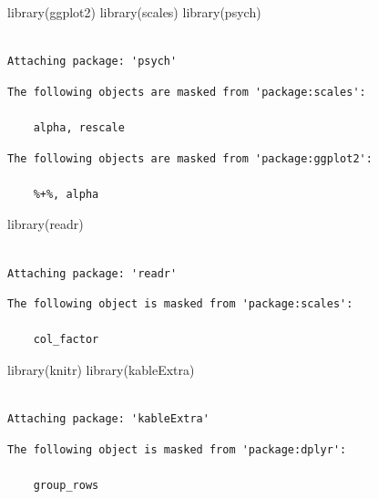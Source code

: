 \documentclass[
  letterpaper,
  DIV=11,
  numbers=noendperiod]{scrreprt}
\newenvironment{Shaded}{\begin{snugshade}}{\end{snugshade}}
\newcommand{\FunctionTok}[1]{\textcolor[rgb]{0.28,0.35,0.67}{#1}}
\newcommand{\NormalTok}[1]{\textcolor[rgb]{0.00,0.23,0.31}{#1}}
\begin{document}
\begin{Shaded}
\begin{Highlighting}[]
\FunctionTok{library}\NormalTok{(ggplot2)}
\FunctionTok{library}\NormalTok{(scales)}
\FunctionTok{library}\NormalTok{(psych)}
\end{Highlighting}
\end{Shaded}

\begin{verbatim}

Attaching package: 'psych'
\end{verbatim}

\begin{verbatim}
The following objects are masked from 'package:scales':

    alpha, rescale
\end{verbatim}

\begin{verbatim}
The following objects are masked from 'package:ggplot2':

    %+%, alpha
\end{verbatim}

\begin{Shaded}
\begin{Highlighting}[]
\FunctionTok{library}\NormalTok{(readr)}
\end{Highlighting}
\end{Shaded}

\begin{verbatim}

Attaching package: 'readr'
\end{verbatim}

\begin{verbatim}
The following object is masked from 'package:scales':

    col_factor
\end{verbatim}

\begin{Shaded}
\begin{Highlighting}[]
\FunctionTok{library}\NormalTok{(knitr)}
\FunctionTok{library}\NormalTok{(kableExtra)}
\end{Highlighting}
\end{Shaded}

\begin{verbatim}

Attaching package: 'kableExtra'
\end{verbatim}

\begin{verbatim}
The following object is masked from 'package:dplyr':

    group_rows
\end{verbatim}
\end{document}
